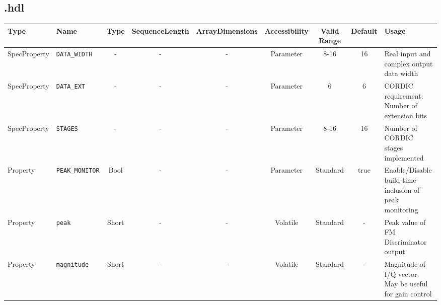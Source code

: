\begin{landscape}
	\subsection*{\comp.hdl}
	\begin{scriptsize}
		\begin{longtable}{|p{3cm}|p{2cm}|c|c|c|c|c|c|p{6cm}|}
			\hline
			\rowcolor{blue}
			Type         & Name              & Type  & SequenceLength & ArrayDimensions & Accessibility & Valid Range & Default & Usage                                                    \\
			\hline
			SpecProperty & \verb+DATA_WIDTH+ & -     & -              & -               & Parameter     & 8-16        & 16      & Real input and complex output data width                 \\
			\hline
			SpecProperty & \verb+DATA_EXT+   & -     & -              & -               & Parameter     & 6           & 6       & CORDIC requirement: Number of extension bits                 \\
			\hline
			SpecProperty & \verb+STAGES+     & -     & -              & -               & Parameter     & 8-16        & 16      & Number of CORDIC stages implemented                      \\
			\hline
			Property & \verb+PEAK_MONITOR+     & Bool     & -              & -               & Parameter     & Standard        & true      & Enable/Disable build-time inclusion of peak monitoring          \\
			\hline
			Property     & \verb+peak+  & Short & -              & -               & Volatile      & Standard    & -       & Peak value of FM Discriminator output \\
			\hline
			Property     & \verb+magnitude+  & Short & -              & -               & Volatile      & Standard    & -       & Magnitude of I/Q vector. May be useful for gain control \\
			\hline

		\end{longtable}
	\end{scriptsize}


\end{landscape}
